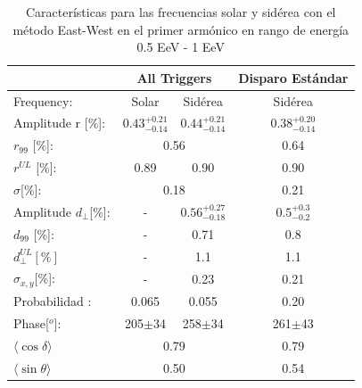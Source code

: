 \documentclass[12pt, doublespace, oneside]{article}
\begin{document}
\begin{table}[H]
        \begin{small}
            \begin{center}
                \begin{tabular}[c]{l|c|c||c|}
\cline{2-4}                                       & \multicolumn{2}{c||}{All Triggers}    & \multicolumn{1}{c|}{Disparo Estándar}   \\ \hline
\multicolumn{1}{|l|}{Frequency:                } & Solar	                & Sidérea	                 & Sidérea \cite{Aab_2020}   \\ \hline
\multicolumn{1}{|l|}{Amplitude r [\%]:           } & $0.43^{+0.21}_{-0.14}$	& $0.44^{+0.21}_{-0.14}$ 	& $0.38^{+0.20}_{-0.14}$ \cite{codigo}      \\
\multicolumn{1}{|l|}{$r_{99}$ [\%]:             } & \multicolumn{2}{c||}{0.56}                          & 0.64\cite{codigo}                 \\
\multicolumn{1}{|l|}{$r^{UL}$ [\%]:             } & 0.89 	                & 0.90                      & 0.90 \cite{codigo}                 \\ 
\multicolumn{1}{|l|}{$\sigma$[\%]:              } & \multicolumn{2}{c||}{0.18}                          & 0.21 \cite{codigo}      \\\hline
\multicolumn{1}{|l|}{Amplitude $d_\perp$[\%]:    } & -	                    & $0.56^{+0.27}_{-0.18}$ 	& $0.5^{+0.3}_{-0.2}$       \\
\multicolumn{1}{|l|}{$d_{99}$ [\%]:             } & - 	                    & 0.71                      & 0.8   \cite{codigo}                \\
\multicolumn{1}{|l|}{$d_{\perp}^{UL}[\%]$       } & -                       & 1.1                       & 1.1                         \\
\multicolumn{1}{|l|}{$\sigma_{x,y}$[\%]:        } & -	                    & 0.23	                    & 0.21       \\\hline
\multicolumn{1}{|l|}{Probabilidad      :        } & 0.065                   & 0.055	                    & 0.20       \\
\multicolumn{1}{|l|}{Phase[$^o$]:                } & 205$\pm$34              & 258$\pm$34                & 261$\pm$43\\ \hline
\multicolumn{1}{|l|}{$\langle\cos\delta \rangle$} & \multicolumn{2}{c||}{0.79}        	                & 0.79 \cite{codigo}        \\        
\multicolumn{1}{|l|}{$\langle\sin\theta \rangle$} & \multicolumn{2}{c||}{0.50}        	                & 0.54\cite{codigo}        \\ \hline       
                \end{tabular}
            \end{center}
        \end{small}
        \caption{Características para las frecuencias solar y sidérea con el método East-West en el primer armónico en rango de energía 0.5 EeV - 1 EeV}
        \label{tab:segundo_bin_data}
    \end{table}
\end{document}
